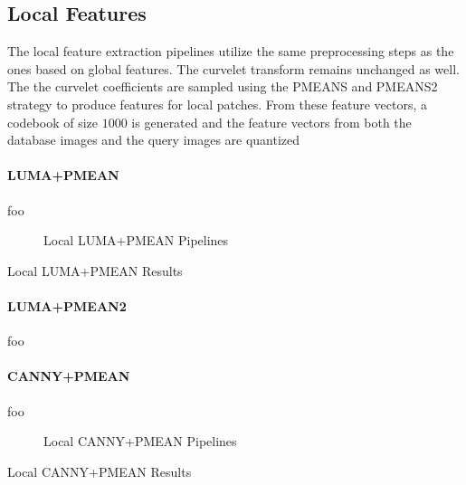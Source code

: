 \subsection{Local Features}

The local feature extraction pipelines utilize the same preprocessing steps as
the ones based on global features. The curvelet transform remains unchanged as
well. The the curvelet coefficients are sampled using the PMEANS and PMEANS2
strategy to produce features for local patches. From these feature vectors, a
codebook of size $1000$ is generated and the feature vectors from both the
database images and the query images are quantized 

\paragraph{LUMA+PMEAN}

foo

\begin{figure}[h]
    \centering
    
    \caption[Local LUMA+PMEAN Pipelines]{
        Local LUMA+PMEAN Pipelines
    }
    \label{fig:pipeline_local_luma_pmean}
\end{figure}

\begin{table}[h]
    \centering
    
    \caption[Local LUMA+PMEAN Results]{
        Local LUMA+PMEAN Results
    }
    \label{tab:results_local_luma_pmean}
\end{table}

\paragraph{LUMA+PMEAN2}

foo

\paragraph{CANNY+PMEAN}

foo

\begin{figure}[h]
    \centering
    
    \caption[Local CANNY+PMEAN Pipelines]{
        Local CANNY+PMEAN Pipelines
    }
    \label{fig:pipeline_local_luma_canny_pmean}
\end{figure}

\begin{table}[h]
    \centering
    
    \caption[Local CANNY+PMEAN Results]{
        Local CANNY+PMEAN Results
    }
    \label{tab:results_local_luma_canny_pmean}
\end{table}

